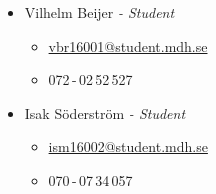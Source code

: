\begin{itemize}
        \item Vilhelm Beijer \textit{- Student}
            \begin{itemize}
                \item \href{mailto:vbr16001@student.mdh.se}{vbr16001@student.mdh.se}
                \item 072\,-\,02\,52\,527
            \end{itemize}

        \item Isak Söderström \textit{- Student}
            \begin{itemize}
                \item \href{mailto:ism16002@student.mdh.se}{ism16002@student.mdh.se}
                \item 070\,-\,07\,34\,057
            \end{itemize}
\end{itemize}





